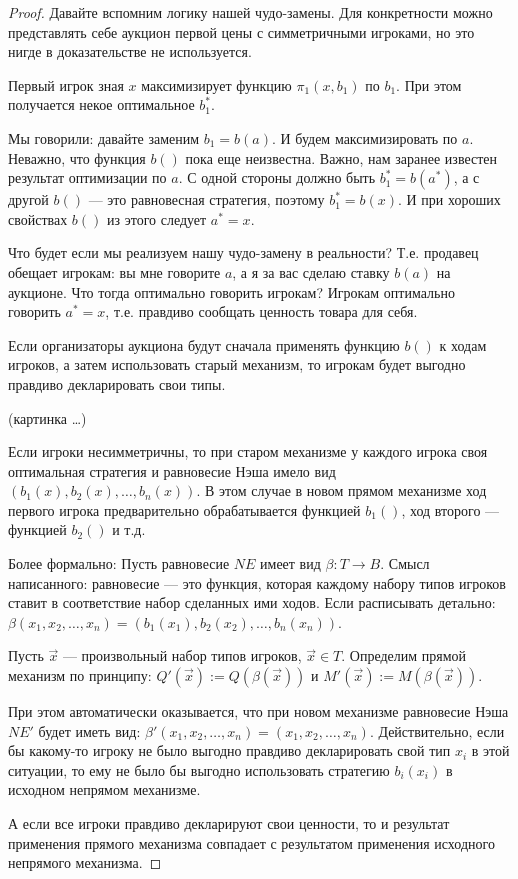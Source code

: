 \begin{proof}
Давайте вспомним логику нашей чудо-замены. Для конкретности можно представлять себе аукцион первой цены с симметричными игроками, но это нигде в доказательстве не используется.

Первый игрок зная $ x $ максимизирует функцию $ \pi_{1}(x,b_{1}) $ по $ b_{1} $. При этом получается некое оптимальное $ b_{1}^{*} $. 

Мы говорили: давайте заменим $ b_{1}=b(a) $. И будем максимизировать по $ a $. Неважно, что функция $ b() $ пока еще неизвестна. Важно, нам заранее известен результат оптимизации по $ a $. С одной стороны должно быть $ b_{1}^{*}=b(a^{*})$, а с другой $ b() $ --- это равновесная стратегия, поэтому $ b_{1}^{*}=b(x) $. И при хороших свойствах $ b() $ из этого следует   $ a^{*}=x $.

Что будет если мы реализуем нашу чудо-замену в реальности? Т.е. продавец обещает игрокам: вы мне говорите $ a $, а я за вас сделаю ставку $ b(a) $ на аукционе. Что тогда оптимально говорить игрокам? Игрокам оптимально говорить $ a^{*}=x $, т.е. правдиво сообщать ценность товара для себя. 

Если организаторы аукциона будут сначала применять функцию $ b() $ к ходам игроков, а затем использовать старый механизм, то игрокам будет выгодно правдиво декларировать свои типы. 

(картинка \ldots)


Если игроки несимметричны, то при старом механизме у каждого игрока своя оптимальная стратегия и равновесие Нэша имело вид $ (b_{1}(x),b_{2}(x),\ldots,b_{n}(x)) $. В этом случае в новом прямом механизме ход первого игрока предварительно обрабатывается функцией $ b_{1}() $, ход второго --- функцией $ b_{2}() $ и т.д.

Более формально: Пусть равновесие $ NE $ имеет вид $ \beta: T\to B $. Смысл написанного: равновесие --- это функция, которая каждому набору типов игроков ставит в соответствие набор сделанных ими ходов. Если расписывать детально: $ \beta(x_{1},x_{2},\ldots,x_{n})=(b_{1}(x_{1}),b_{2}(x_{2}),\ldots,b_{n}(x_{n})) $.

Пусть $ \vec{x} $ --- произвольный набор типов игроков, $ \vec{x}\in T $. Определим прямой механизм по принципу: $ Q'(\vec{x}):=Q(\beta(\vec{x})) $ и 
$ M'(\vec{x}):=M(\beta(\vec{x}))  $. 

При этом автоматически оказывается, что при новом механизме равновесие Нэша $ NE' $ будет иметь вид: $ \beta'(x_{1},x_{2},\ldots,x_{n})=(x_{1},x_{2},\ldots,x_{n}) $. Действительно, если бы какому-то игроку  не было выгодно правдиво декларировать свой тип $ x_{i} $ в этой ситуации, то ему не было бы выгодно использовать стратегию $ b_{i}(x_{i}) $ в исходном непрямом механизме.

А если все игроки правдиво декларируют свои ценности, то и результат применения прямого механизма совпадает с результатом применения исходного непрямого механизма.
\end{proof}

